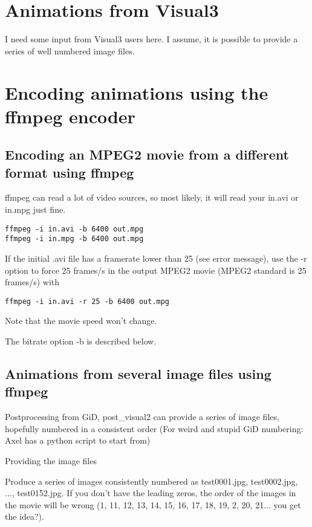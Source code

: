 \section{Animations from Visual3}

 I need some input from Visual3 users here. I assume, it is possible
 to provide a series of well numbered image files.

\section{Encoding animations using the ffmpeg encoder}

\subsection{Encoding an MPEG2 movie from a different format using ffmpeg}

 ffmpeg can read a lot of video sources, so most likely, it will read
 your in.avi or in.mpg just fine.

\begin{verbatim}
ffmpeg -i in.avi -b 6400 out.mpg
ffmpeg -i in.mpg -b 6400 out.mpg
\end{verbatim}

 If the initial .avi file has a framerate lower than 25 (see error message), use the -r option to force 25 frames/s in the output MPEG2 movie (MPEG2 standard is 25 frames/s) with

\begin{verbatim}
ffmpeg -i in.avi -r 25 -b 6400 out.mpg
\end{verbatim}

 Note that the movie speed won't change. 

 The bitrate option -b is described below.

\subsection{Animations from several image files using ffmpeg}

 Postprocessing from GiD, post\_visual2 can provide a series of image
 files, hopefully numbered in a consistent order (For weird and stupid
 GiD numbering: Axel has a python script to start from)

Providing the image files

 Produce a series of images consistently numbered as test0001.jpg,
test0002.jpg, ..., test0152.jpg. If you don't have the leading zeros,
the order of the images in the movie will be wrong (1, 11, 12, 13, 14,
15, 16, 17, 18, 19, 2, 20, 21... you get the idea?). 

